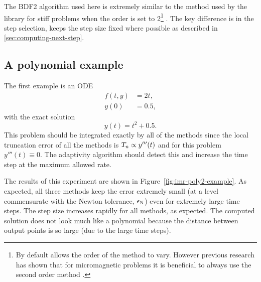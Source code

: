 The BDF2 algorithm used here is extremely similar to the method used by the \cvode library for stiff problems when the order is set to 2\footnote{By default \cvode allows the order of the method to vary.
  However previous research has shown that for micromagnetic problems it is beneficial to always use the second order method \cite{Suess2002}.} \cite{cvode-manual}.
The key difference is in the step selection, \cvode keeps the step size fixed where possible as described in \cref{sec:computing-next-step}.

\subsection{A polynomial example}
\label{sec:imr-polynomial-example}

The first example is an ODE
\begin{equation}
  \begin{aligned}
    f(t,y) &= 2t, \\
    y(0) &= 0.5,
  \end{aligned}
\end{equation}
with the exact solution
\begin{equation}
  y(t) = t^2 + 0.5.
\end{equation}
This problem should be integrated exactly by all of the methods since the local truncation error of all the methods is $T_n \propto y'''(t)$ and for this problem $y'''(t) \equiv 0$.
The adaptivity algorithm should detect this and increase the time step at the maximum allowed rate.

The results of this experiment are shown in Figure~\ref{fig:imr-poly2-example}.
As expected, all three methods keep the error extremely small (at a level commensurate with the Newton tolerance, $\epsilon_{\mathrm{N}}$) even for extremely large time steps.
The step size increases rapidly for all methods, as expected.
The computed solution does not look much like a polynomial because the distance between output points is so large (due to the large time steps).

